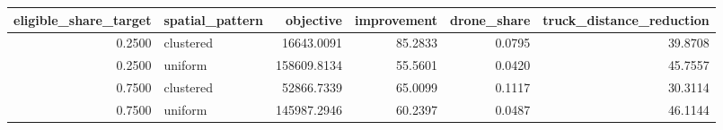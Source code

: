 \begin{tabular}{rlrrrr}
\toprule
eligible_share_target & spatial_pattern & objective & improvement & drone_share & truck_distance_reduction \\
\midrule
0.2500 & clustered & 16643.0091 & 85.2833 & 0.0795 & 39.8708 \\
0.2500 & uniform & 158609.8134 & 55.5601 & 0.0420 & 45.7557 \\
0.7500 & clustered & 52866.7339 & 65.0099 & 0.1117 & 30.3114 \\
0.7500 & uniform & 145987.2946 & 60.2397 & 0.0487 & 46.1144 \\
\bottomrule
\end{tabular}
